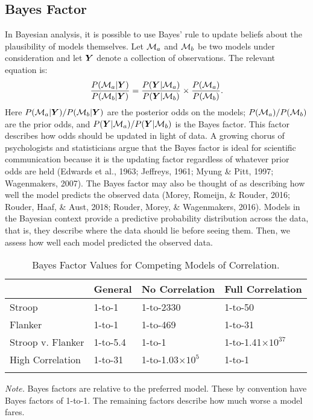 \documentclass[english,man]{apa6}
\theoremstyle{definition}
\theoremstyle{definition}
\theoremstyle{remark}
\begin{document}
\subsection{Bayes Factor}\label{bayes-factor}

In Bayesian analysis, it is possible to use Bayes' rule to update
beliefs about the plausibility of models themselves. Let \({\cal M}_a\) and
\({\cal M}_b\) be two models under consideration and let \(\bm Y\) denote a
collection of observations. The relevant equation is: \[
\frac{P({\cal M}_a|\bm Y)}{P({\cal M}_b|\bm Y)} = \frac{P(\bm Y|{\cal M}_a)}{P(\bm Y|{\cal M}_b)} \times \frac{P({\cal M}_a)}{P({\cal M}_b)}.
\] Here \({P({\cal M}_a|\bm Y)}/{P({\cal M}_b|\bm Y)}\) are the posterior odds
on the models; \(P({\cal M}_a)/P({\cal M}_b)\) are the prior odds, and
\(P(\bm Y|{\cal M}_a)/P(\bm Y|{\cal M}_b)\) is the Bayes factor. This factor
describes how odds should be updated in light of data. A growing chorus
of psychologists and statisticians argue that the Bayes factor is ideal
for scientific communication because it is the updating factor
regardless of whatever prior odds are held (Edwards et al., 1963;
Jeffreys, 1961; Myung \& Pitt, 1997; Wagenmakers, 2007). The Bayes
factor may also be thought of as describing how well the model predicts
the observed data (Morey, Romeijn, \& Rouder, 2016; Rouder, Haaf, \&
Aust, 2018; Rouder, Morey, \& Wagenmakers, 2016). Models in the Bayesian
context provide a predictive probability distribution across the data,
that is, they describe where the data should lie before seeing them.
Then, we assess how well each model predicted the observed data.

\begin{table}[tbp]
\begin{center}
\begin{threeparttable}
\caption{\label{tab:bftab}Bayes Factor Values for Competing Models of Correlation.}
\begin{tabular}{llll}
\toprule
 & \multicolumn{1}{c}{General} & \multicolumn{1}{c}{No Correlation} & \multicolumn{1}{c}{Full Correlation}\\
\midrule
Stroop & 1-to-1 & 1-to-2330 & 1-to-50\\
Flanker & 1-to-1 & 1-to-469 & 1-to-31\\
Stroop v. Flanker & 1-to-5.4 & 1-to-1 & 1-to-1.41$\times 10^{37}$\\
High Correlation & 1-to-31 & 1-to-1.03$\times 10^{5}$ & 1-to-1\\
\bottomrule
\addlinespace
\end{tabular}
\begin{tablenotes}[para]
\textit{Note.} Bayes factors are relative to the preferred model.  These by convention have Bayes factors of 1-to-1.  The remaining factors describe how much worse a model fares.
\end{tablenotes}
\end{threeparttable}
\end{center}
\end{table}
\end{document}
